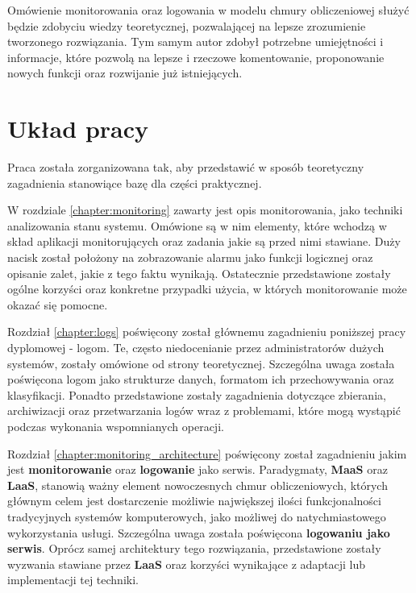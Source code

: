 Omówienie monitorowania oraz logowania w modelu chmury obliczeniowej służyć będzie zdobyciu wiedzy
teoretycznej, pozwalającej na lepsze zrozumienie tworzonego rozwiązania. Tym samym autor zdobył potrzebne umiejętności i informacje, 
które pozwolą na lepsze i rzeczowe komentowanie, proponowanie nowych funkcji oraz rozwijanie już istniejących.  

\section{Układ pracy}
Praca została zorganizowana tak, aby przedstawić w sposób teoretyczny
zagadnienia stanowiące bazę dla części praktycznej.

W rozdziale \ref{chapter:monitoring} zawarty jest opis monitorowania, jako techniki
analizowania stanu systemu. Omówione są w nim elementy, które wchodzą w skład aplikacji
monitorujących oraz zadania jakie są przed nimi stawiane. Duży nacisk został położony
na zobrazowanie alarmu jako funkcji logicznej oraz opisanie zalet, jakie z tego faktu
wynikają. Ostatecznie przedstawione zostały ogólne korzyści oraz konkretne przypadki użycia,
w których monitorowanie może okazać się pomocne.

Rozdział \ref{chapter:logs} poświęcony został głównemu zagadnieniu poniższej pracy dyplomowej - logom.
Te, często niedocenianie przez administratorów dużych systemów, zostały omówione od strony teoretycznej. Szczególna uwaga została poświęcona logom jako strukturze danych, formatom ich
przechowywania oraz klasyfikacji. Ponadto przedstawione zostały zagadnienia dotyczące
zbierania, archiwizacji oraz przetwarzania logów wraz z problemami, które mogą wystąpić 
podczas wykonania wspomnianych operacji.

Rozdział \ref{chapter:monitoring_architecture} poświęcony został zagadnieniu jakim jest
\textbf{monitorowanie} oraz \textbf{logowanie} jako serwis. Paradygmaty, \textbf{MaaS} oraz \textbf{LaaS}, stanowią ważny element nowoczesnych chmur obliczeniowych,
których głównym celem jest dostarczenie możliwie największej ilości funkcjonalności tradycyjnych
systemów komputerowych, jako możliwej do natychmiastowego wykorzystania usługi. Szczególna uwaga została poświęcona \textbf{logowaniu jako serwis}. Oprócz samej architektury tego
rozwiązania, przedstawione zostały wyzwania stawiane przez \textbf{LaaS} oraz korzyści wynikające
z adaptacji lub implementacji tej techniki.

